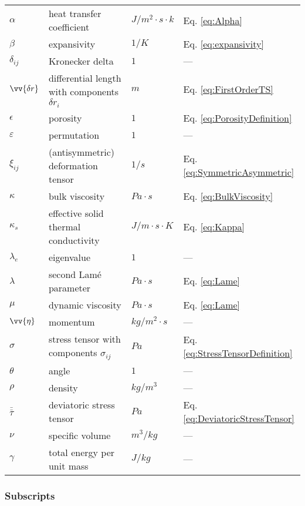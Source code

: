 \documentclass[10pt]{article}
\numberwithin{equation}{section} %
\begin{document}
\begin{tabular}{l l l l}
\(\alpha\)		& heat transfer coefficient						& \(J/m^2\cdot s\cdot k\)	& Eq. \eqref{eq:Alpha}\\
\(\beta\)		& expansivity								& \(1/K\)				& Eq. \eqref{eq:expansivity}\\
\(\delta_{ij}\)	& Kronecker delta							& \(1\)				& ---\\
\(\vv{\delta r}\)	& differential length with components \(\delta r_i\)	& \(m\)				& Eq. \eqref{eq:FirstOrderTS}\\
\(\epsilon\)		& porosity 								&\(1\)				& Eq. \eqref{eq:PorosityDefinition}\\
\(\varepsilon\)	& permutation								& \(1\)				& ---\\
\(\xi_{ij}\)		& (antisymmetric) deformation tensor			& \(1/s\)				& Eq. \eqref{eq:SymmetricAsymmetric}\\
\(\kappa\)		& bulk viscosity								& \(Pa\cdot s\)			& Eq. \eqref{eq:BulkViscosity}\\
\(\kappa_s\)	& effective solid thermal conductivity				& \(J/m\cdot s\cdot K\)	& Eq. \eqref{eq:Kappa}\\
\(\lambda_e\)	& eigenvalue								& \(1\)				& ---\\
\(\lambda\)	& second Lam\'{e} parameter					& \(Pa\cdot s\)			& Eq. \eqref{eq:Lame}\\
\(\mu\)		& dynamic viscosity							& \(Pa\cdot s\)			& Eq. \eqref{eq:Lame}\\
\(\vv{\eta}\)	& momentum								& \(kg/m^2\cdot s\)		& ---\\
\(\sigma\)		& stress tensor with components \(\sigma_{ij}\)		& \(Pa\)				& Eq. \eqref{eq:StressTensorDefinition}\\
\(\theta\)		& angle									& \(1\)				& ---\\
\(\rho\)		& density									& \(kg/m^3\)			& ---\\
\(\bar{\bar{\tau}}\)	& deviatoric stress tensor					& \(Pa\)				& Eq. \eqref{eq:DeviatoricStressTensor}\\
\(\nu\)		& specific volume							& \(m^3/kg\)			& ---\\
\(\gamma\)	& total energy per unit mass					& \(J/kg\)				& ---\\
\end{tabular}


\subsubsection{Subscripts}
\end{document}
